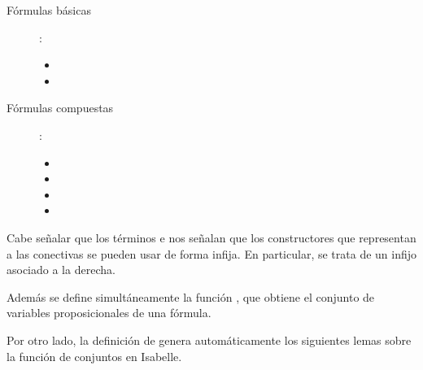 \begin{isabellebody}
\begin{isamarkuptext}
  \begin{description}
    \item[Fórmulas básicas]:  
      \begin{itemize}
        \item {}
        \item {}
      \end{itemize}
    \item [Fórmulas compuestas]:
      \begin{itemize}
        \item {}
        \item {}
        \item {}
        \item {}
      \end{itemize}
  \end{description}

  Cabe señalar que los términos  e  nos señalan que 
  los constructores que representan a las conectivas se pueden usar de
  forma infija. En particular,  se trata de un infijo asociado a 
  la derecha.

  Además se define simultáneamente la función , que 
  obtiene el conjunto de variables proposicionales de una fórmula. 

  Por otro lado, la definición de  genera 
  automáticamente los siguientes lemas sobre la función de conjuntos 
   en Isabelle.
  

\end{isamarkuptext}
\end{isabellebody}
